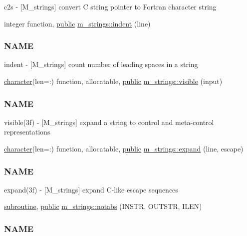 \begin{DoxyCompactItemize}
\begin{DoxyCompactList}
c2s -\/ \mbox{[}M\+\_\+strings\mbox{]} convert C string pointer to Fortran character string \end{DoxyCompactList}\item 
integer function, \hyperlink{M__stopwatch_83_8txt_a2f74811300c361e53b430611a7d1769f}{public} \hyperlink{namespacem__strings_a020dcca7f01d33eedf28b17518a22b69}{m\+\_\+strings\+::indent} (line)
\begin{DoxyCompactList}\small\item\em \subsubsection*{N\+A\+ME}

indent -\/ \mbox{[}M\+\_\+strings\mbox{]} count number of leading spaces in a string \end{DoxyCompactList}\item 
\hyperlink{option__stopwatch_83_8txt_abd4b21fbbd175834027b5224bfe97e66}{character}(len=\+:) function, allocatable, \hyperlink{M__stopwatch_83_8txt_a2f74811300c361e53b430611a7d1769f}{public} \hyperlink{namespacem__strings_a791e24ceb690010fd42a6c1f48311b55}{m\+\_\+strings\+::visible} (input)
\begin{DoxyCompactList}\small\item\em \subsubsection*{N\+A\+ME}

visible(3f) -\/ \mbox{[}M\+\_\+strings\mbox{]} expand a string to control and meta-\/control representations \end{DoxyCompactList}\item 
\hyperlink{option__stopwatch_83_8txt_abd4b21fbbd175834027b5224bfe97e66}{character}(len=\+:) function, allocatable, \hyperlink{M__stopwatch_83_8txt_a2f74811300c361e53b430611a7d1769f}{public} \hyperlink{namespacem__strings_a33b248107c1521272b55cda5c4077378}{m\+\_\+strings\+::expand} (line, escape)
\begin{DoxyCompactList}\small\item\em \subsubsection*{N\+A\+ME}

expand(3f) -\/ \mbox{[}M\+\_\+strings\mbox{]} expand C-\/like escape sequences \end{DoxyCompactList}\item 
\hyperlink{M__stopwatch_83_8txt_acfbcff50169d691ff02d4a123ed70482}{subroutine}, \hyperlink{M__stopwatch_83_8txt_a2f74811300c361e53b430611a7d1769f}{public} \hyperlink{namespacem__strings_a3bf44ac06a670f55830e17a6f1108b9c}{m\+\_\+strings\+::notabs} (I\+N\+S\+TR, O\+U\+T\+S\+TR, I\+L\+EN)
\begin{DoxyCompactList}\small\item\em \subsubsection*{N\+A\+ME}


\end{DoxyCompactList}
\end{DoxyCompactItemize}
